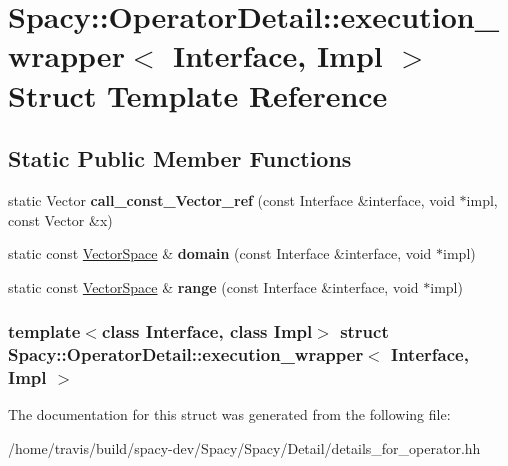 \hypertarget{structSpacy_1_1OperatorDetail_1_1execution__wrapper}{\section{\-Spacy\-:\-:\-Operator\-Detail\-:\-:execution\-\_\-wrapper$<$ \-Interface, \-Impl $>$ \-Struct \-Template \-Reference}
\label{structSpacy_1_1OperatorDetail_1_1execution__wrapper}
}
\subsection*{\-Static \-Public \-Member \-Functions}
\begin{DoxyCompactItemize}
\item 
\hypertarget{structSpacy_1_1OperatorDetail_1_1execution__wrapper_a30a050436a92d36a9a768c9b37822fb4}{static \-Vector {\bfseries call\-\_\-const\-\_\-\-Vector\-\_\-ref} (const \-Interface \&interface, void $\ast$impl, const \-Vector \&x)}\label{structSpacy_1_1OperatorDetail_1_1execution__wrapper_a30a050436a92d36a9a768c9b37822fb4}

\item 
\hypertarget{structSpacy_1_1OperatorDetail_1_1execution__wrapper_af62d9893d588a4eafd80063811a95c7a}{static const \hyperlink{classSpacy_1_1VectorSpace}{\-Vector\-Space} \& {\bfseries domain} (const \-Interface \&interface, void $\ast$impl)}\label{structSpacy_1_1OperatorDetail_1_1execution__wrapper_af62d9893d588a4eafd80063811a95c7a}

\item 
\hypertarget{structSpacy_1_1OperatorDetail_1_1execution__wrapper_ae45d2e1327d3d8cbf5231e65cdcf2760}{static const \hyperlink{classSpacy_1_1VectorSpace}{\-Vector\-Space} \& {\bfseries range} (const \-Interface \&interface, void $\ast$impl)}\label{structSpacy_1_1OperatorDetail_1_1execution__wrapper_ae45d2e1327d3d8cbf5231e65cdcf2760}

\end{DoxyCompactItemize}
\subsubsection*{template$<$class Interface, class Impl$>$ struct Spacy\-::\-Operator\-Detail\-::execution\-\_\-wrapper$<$ Interface, Impl $>$}



\-The documentation for this struct was generated from the following file\-:\begin{DoxyCompactItemize}
\item 
/home/travis/build/spacy-\/dev/\-Spacy/\-Spacy/\-Detail/details\-\_\-for\-\_\-operator.\-hh\end{DoxyCompactItemize}
